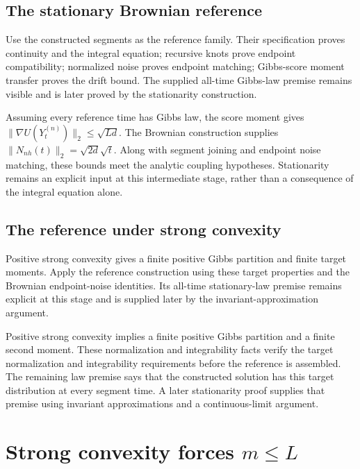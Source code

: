 \documentclass[11pt,a4paper]{report}
\begin{document}
\subsection{\texorpdfstring{The stationary Brownian reference}{The stationary Brownian reference}}
\label{report-step-UnadjustedLangevin-BrownianReference-lean-9}


Use the constructed segments as the reference family. Their specification proves continuity and the integral equation; recursive knots prove endpoint compatibility; normalized noise proves endpoint matching; Gibbs-score moment transfer proves the drift bound. The supplied all-time Gibbs-law premise remains visible and is later proved by the stationarity construction.



Assuming every reference time has Gibbs law, the score moment gives \(\|\nabla U(Y_t^{(n)})\|_2\le\sqrt{Ld}\). The Brownian construction supplies \(\|N_{nh}(t)\|_2=\sqrt{2d}\sqrt t\). Along with segment joining and endpoint noise matching, these bounds meet the analytic coupling hypotheses. Stationarity remains an explicit input at this intermediate stage, rather than a consequence of the integral equation alone.

\subsection{\texorpdfstring{The reference under strong convexity}{The reference under strong convexity}}
\label{report-step-UnadjustedLangevin-BrownianReference-lean-10}


Positive strong convexity gives a finite positive Gibbs partition and finite target moments. Apply the reference construction using these target properties and the Brownian endpoint-noise identities. Its all-time stationary-law premise remains explicit at this stage and is supplied later by the invariant-approximation argument.



Positive strong convexity implies a finite positive Gibbs partition and a finite second moment. These normalization and integrability facts verify the target normalization and integrability requirements before the reference is assembled. The remaining law premise says that the constructed solution has this target distribution at every segment time. A later stationarity proof supplies that premise using invariant approximations and a continuous-limit argument.

\section{\texorpdfstring{Strong convexity forces \(m\le L\)}{Strong convexity forces m≤ L}}
\label{proof-module-UnadjustedLangevin-PotentialAssumptions-lean}
\end{document}
